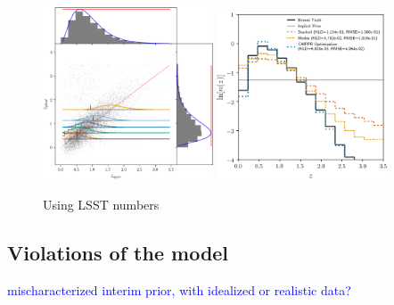 \documentclass[iop]{emulateapj}
\begin{document}
\begin{figure}
	\begin{center}
		\includegraphics[width=0.45\textwidth]{fig/lsst_scatter.png}
		\includegraphics[width=0.45\textwidth]{fig/lsst_log_estimators.png}
		\caption{Using LSST numbers}
		\label{fig:lsstdemo}
	\end{center}
\end{figure}

\subsection{Violations of the model}
\label{sec:violations}

\textcolor{blue}{mischaracterized interim prior, with idealized or realistic data?}
\end{document}
